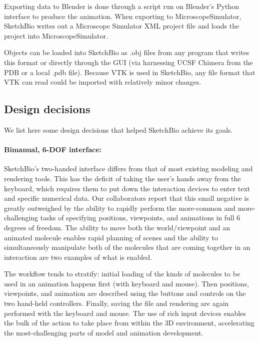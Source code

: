 \documentclass[twocolumn]{bmcart}%
\begin{document}
Exporting data to Blender is done through a script run on Blender's Python interface to produce the animation.
When exporting to MicroscopeSimulator, SketchBio writes out a Microscope Simulator XML project file and loads the project into MicroscopeSimulator.

Objects can be loaded into SketchBio as .obj files from any program that writes this format or directly through the GUI (via harnessing UCSF Chimera from the PDB or a local .pdb file).
Because VTK is used in SketchBio, any file format that VTK can read could be imported with relatively minor changes.

\subsection*{Design decisions}
We list here some design decisions that helped SketchBio achieve its goals.

\paragraph*{Bimanual, 6-DOF interface:} SketchBio's two-handed interface differs from that of most existing modeling and rendering tools. This has the deficit of taking the user's hands away from the keyboard, which requires them to put down the interaction devices to enter text and specific numerical data. Our collaborators report that this small negative is greatly outweighed by the ability to rapidly perform the more-common and more-challenging tasks of specifying positions, viewpoints, and animations in full 6 degrees of freedom. The ability to move both the world/viewpoint and an animated molecule enables rapid planning of scenes and the ability to simultaneously manipulate both of the molecules that are coming together in an interaction are two examples of what is enabled.

The workflow tends to stratify: initial loading of the kinds of molecules to be used in an animation happens first (with keyboard and mouse). Then positions, viewpoints, and animation are described using the buttons and controls on the two hand-held controllers. Finally, saving the file and rendering are again performed with the keyboard and mouse. The use of rich input devices enables the bulk of the action to take place from within the 3D environment, accelerating the most-challenging parts of model and animation development.
\end{document}
